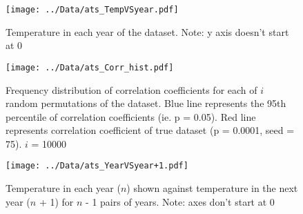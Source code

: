 \documentclass[12pt]{article}
\begin{document}
		
	\begin{figure}
		\texttt{[image: ../Data/ats\_TempVSyear.pdf]}				
		\caption{\label{fig:dataset} Temperature in each year of the dataset. Note: y axis doesn't start at 0}
	\end{figure}
	
	\begin{figure}
		\texttt{[image: ../Data/ats\_Corr\_hist.pdf]}
		\caption{\label{fig:histogram} Frequency distribution of correlation coefficients for each of $i$ random permutations of the dataset. Blue line represents the 95th percentile of correlation coefficients (ie. p = 0.05). Red line represents correlation coefficient of true dataset (p = 0.0001, seed = 75). $i$ = 10000}
	\end{figure}
	
	\begin{figure}
		\texttt{[image: ../Data/ats\_YearVSyear+1.pdf]}
		\caption{\label{fig:n+1} Temperature in each year ($n$) shown against temperature in the next year ($n$ + 1) for $n$ - 1 pairs of years. Note: axes don't start at 0}
	\end{figure}
	
\end{document}
